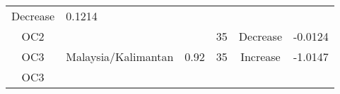 \documentclass[]{article}
\begin{document}
\begin{longtable}[]{@{}clrccr@{}}
\begin{minipage}[t]{0.16\columnwidth}
Decrease\strut
\end{minipage} & \begin{minipage}[t]{0.09\columnwidth}\raggedleft\strut
0.1214\strut
\end{minipage}\tabularnewline
\begin{minipage}[t]{0.08\columnwidth}\centering\strut
OC2\strut
\end{minipage} & \begin{minipage}[t]{0.29\columnwidth}\raggedright\strut
\strut
\end{minipage} & \begin{minipage}[t]{0.11\columnwidth}\raggedleft\strut
\strut
\end{minipage} & \begin{minipage}[t]{0.10\columnwidth}\centering\strut
35\strut
\end{minipage} & \begin{minipage}[t]{0.16\columnwidth}\centering\strut
Decrease\strut
\end{minipage} & \begin{minipage}[t]{0.09\columnwidth}\raggedleft\strut
-0.0124\strut
\end{minipage}\tabularnewline
\begin{minipage}[t]{0.08\columnwidth}\centering\strut
OC3\strut
\end{minipage} & \begin{minipage}[t]{0.29\columnwidth}\raggedright\strut
Malaysia/Kalimantan\strut
\end{minipage} & \begin{minipage}[t]{0.11\columnwidth}\raggedleft\strut
0.92\strut
\end{minipage} & \begin{minipage}[t]{0.10\columnwidth}\centering\strut
35\strut
\end{minipage} & \begin{minipage}[t]{0.16\columnwidth}\centering\strut
Increase\strut
\end{minipage} & \begin{minipage}[t]{0.09\columnwidth}\raggedleft\strut
-1.0147\strut
\end{minipage}\tabularnewline
\begin{minipage}[t]{0.08\columnwidth}\centering\strut
OC3\strut
\end{minipage} & \begin{minipage}[t]{0.29\columnwidth}\raggedright\strut
\strut
\end{minipage} & \begin{minipage}[t]{0.11\columnwidth}\raggedleft\strut

\end{minipage}
\end{longtable}
\end{document}
